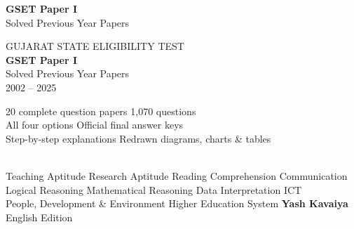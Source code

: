 \thispagestyle{empty}
\vspace*{0.3\textheight}
\begin{center}
{\sffamily\Huge\bfseries\color{ink} GSET Paper I}\\[8pt]
{\sffamily\Large\color{brand} Solved Previous Year Papers}
\end{center}
\cleardoublepage

\thispagestyle{empty}
\vspace*{1.25in}
\begin{center}
{\sffamily\small\color{brand}\MakeUppercase{Gujarat State Eligibility Test}}\\[18pt]
{\sffamily\fontsize{34}{40}\selectfont\bfseries\color{ink} GSET Paper I}\\[10pt]
{\sffamily\LARGE\color{ink} Solved Previous Year Papers}\\[6pt]
{\sffamily\Large\color{accent} 2002 -- 2025}\\[28pt]
\begin{minipage}{0.82\linewidth}\centering\large
20 complete question papers \textbullet{} 1{,}070 questions\\[3pt]
All four options \textbullet{} Official final answer keys\\[3pt]
Step-by-step explanations \textbullet{} Redrawn diagrams, charts \& tables
\end{minipage}\\[30pt]
{\sffamily\small Teaching Aptitude \textbullet{} Research Aptitude \textbullet{} Reading Comprehension \textbullet{} Communication\\
Logical Reasoning \textbullet{} Mathematical Reasoning \textbullet{} Data Interpretation \textbullet{} ICT\\
People, Development \& Environment \textbullet{} Higher Education System}
\vfill
{\sffamily\Large\bfseries Yash Kavaiya}\\[4pt]
{\sffamily\small English Edition}
\end{center}
\newpage
